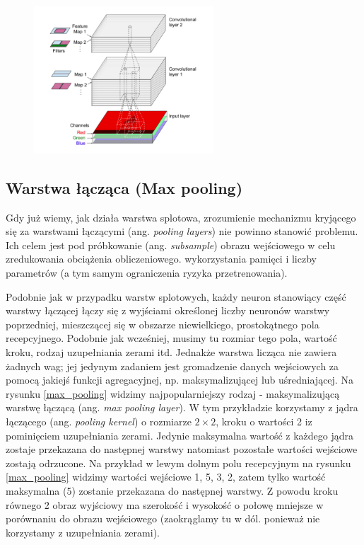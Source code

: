 \documentclass{article}
\begin{document}
\begin{figure}[H]
	\centering
	\includegraphics[width=0.6\textwidth,keepaspectratio=true]{stosy_map_cech}
	\caption{}
	\label{stosy_map_cech}
\end{figure}

\subsection{Warstwa łącząca (Max pooling)}
Gdy już wiemy, jak działa warstwa splotowa, zrozumienie mechanizmu kryjącego się za warstwami łączącymi (ang. \textit{pooling layers}) nie powinno stanowić problemu. Ich celem jest pod próbkowanie (ang. \textit{subsample}) obrazu wejściowego w celu zredukowania obciążenia obliczeniowego. wykorzystania pamięci i liczby parametrów (a tym samym ograniczenia ryzyka przetrenowania). \cite{geron}

Podobnie jak w przypadku warstw splotowych, każdy neuron stanowiący część warstwy łączącej łączy się z wyjściami określonej liczby neuronów warstwy poprzedniej, mieszczącej się w obszarze niewielkiego, prostokątnego pola recepcyjnego. Podobnie jak wcześniej, musimy tu rozmiar tego pola, wartość kroku, rodzaj uzupełniania zerami itd. Jednakże warstwa licząca nie zawiera żadnych wag; jej jedynym zadaniem jest gromadzenie danych wejściowych za pomocą jakiejś funkcji agregacyjnej, np. maksymalizującej lub uśredniającej. Na rysunku \ref{max_pooling} widzimy najpopularniejszy rodzaj - maksymalizującą warstwę łączącą (ang. \textit{max pooling layer}). W tym przykładzie korzystamy z jądra łączącego (ang. \textit{pooling kernel}) o rozmiarze $2 \times 2$, kroku o wartości 2 iz pominięciem uzupełniania zerami. Jedynie maksymalna wartość z każdego jądra zostaje przekazana do następnej warstwy natomiast pozostałe wartości wejściowe zostają odrzucone. Na przykład w lewym dolnym polu recepcyjnym na rysunku \ref{max_pooling} widzimy wartości wejściowe 1, 5, 3, 2, zatem tylko wartość maksymalna (5) zostanie przekazana do następnej warstwy. Z powodu kroku równego 2 obraz wyjściowy ma szerokość i wysokość o połowę mniejsze w porównaniu do obrazu wejściowego (zaokrąglamy tu w dól. ponieważ nie korzystamy z uzupełniania zerami). \cite{geron}
\end{document}
